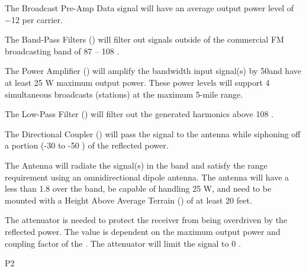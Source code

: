 {
	\item The \FM \RF Broadcast Pre-Amp Data signal will have an average output power level of −12 \dBm per \RF carrier.
	\item The Band-Pass Filters (\BPF) will filter out signals outside of the commercial FM broadcasting band of 87 – 108 \MHz.
	\item The \RF Power Amplifier (\PA) will amplify the \FM bandwidth input signal(s) by 50\dB and have at least 25 W maximum output power. These power levels will support 4 simultaneous \FM broadcasts (\FM stations) at the maximum 5-mile range.
	\item The Low-Pass Filter (\LPF) will filter out the generated harmonics above 108 \MHz.
	\item The Directional Coupler (\DC) will pass the \RF signal to the antenna while siphoning off a portion (-30 to -50 \dB) of the reflected power.
	\item The Antenna will radiate the \RF signal(s) in the \FM band and satisfy the range requirement using an omnidirectional dipole antenna. The antenna will have a \VSWR less than 1.8 over the \FM band, be capable of handling 25 W, and need to be mounted with a Height Above Average Terrain (\HAAT) of at least 20 feet.
	\item The attenuator is needed to protect the receiver from being overdriven by the reflected power. The value is dependent on the maximum \PA output power and coupling factor of the \DC. The attenuator will limit the signal to 0 \dBm.
}
{P2}

